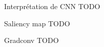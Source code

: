 \begin{frame}{Interprétation de CNN}
  \alert{TODO}
\end{frame}

\begin{frame}{Saliency map}
    \alert{TODO}
\end{frame}

\begin{frame}{Gradconv}
    \alert{TODO}
\end{frame}
  